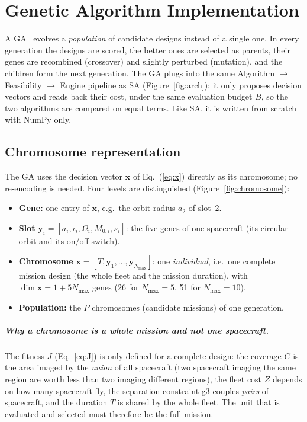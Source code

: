 \chapter{Genetic Algorithm Implementation}
\label{ch:ga}

A \ac{GA}~\cite{holland1975,goldberg1989} evolves a \emph{population} of candidate designs instead
of a single one. In every generation the designs are scored, the better ones are selected as
parents, their genes are recombined (crossover) and slightly perturbed (mutation), and the children
form the next generation. The \ac{GA} plugs into the same Algorithm $\rightarrow$ Feasibility
$\rightarrow$ Engine pipeline as \ac{SA} (Figure~\ref{fig:arch}): it only proposes decision vectors
and reads back their cost, under the same evaluation budget $B$, so the two algorithms are compared
on equal terms. Like \ac{SA}, it is written from scratch with NumPy only.

\section{Chromosome representation}
\label{sec:ga-chromosome}

The \ac{GA} uses the decision vector $\mathbf{x}$ of Eq.~(\ref{eq:x}) directly as its chromosome;
no re-encoding is needed. Four levels are distinguished (Figure~\ref{fig:chromosome}):

\begin{itemize}
  \item \textbf{Gene:} one entry of $\mathbf{x}$, e.g.\ the orbit radius $a_2$ of slot~2.
  \item \textbf{Slot} $\mathbf{y}_i=[a_i,\iota_i,\Omega_i,M_{0,i},s_i]$: the five genes of one
        spacecraft (its circular orbit and its on/off switch).
  \item \textbf{Chromosome} $\mathbf{x}=[T,\mathbf{y}_1,\dots,\mathbf{y}_{N_{\max}}]$: one
        \emph{individual}, i.e.\ one complete mission design (the whole fleet and the mission
        duration), with $\dim\mathbf{x}=1+5N_{\max}$ genes (26 for $N_{\max}=5$, 51 for $N_{\max}=10$).
  \item \textbf{Population:} the $P$ chromosomes (candidate missions) of one generation.
\end{itemize}

\paragraph{Why a chromosome is a whole mission and not one spacecraft.} The fitness $J$
(Eq.~\ref{eq:J}) is only defined for a complete design: the coverage $C$ is the area imaged by the
\emph{union} of all spacecraft (two spacecraft imaging the same region are worth less than two
imaging different regions), the fleet cost $Z$ depends on how many spacecraft fly, the separation
constraint g3 couples \emph{pairs} of spacecraft, and the duration $T$ is shared by the whole fleet.
The unit that is evaluated and selected must therefore be the full mission.

